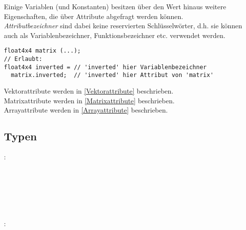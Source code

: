 
Einige Variablen (und Konstanten) besitzen über den Wert hinaus weitere Eigenschaften, die
über Attribute abgefragt werden können. \\
\emph{Attributbezeichner} sind dabei keine reservierten
Schlüsselwörter, d.h. sie können auch als Variablenbezeichner, Funktionsbezeichner etc.
verwendet werden.

\begin{lstlisting}
float4x4 matrix (...);
// Erlaubt:
float4x4 inverted = // 'inverted' hier Variablenbezeichner
  matrix.inverted;  // 'inverted' hier Attribut von 'matrix'
\end{lstlisting}

\noindent Vektorattribute werden in \ref{Vektorattribute} beschrieben.\\
Matrixattribute werden in \ref{Matrixattribute} beschrieben.\\
Arrayattribute werden in \ref{Arrayattribute} beschrieben.\\


\subsection{Typen}\label{Typen}
:\label{typ_basis}\\
\hspace*{1cm} \\
\hspace*{1cm} \\
\hspace*{1cm} \\
\hspace*{1cm} \\
\hspace*{1cm} \\
\hspace*{1cm}\\
:\label{typ}\\
\hspace*{1cm} \\
\hspace*{1cm} \\
